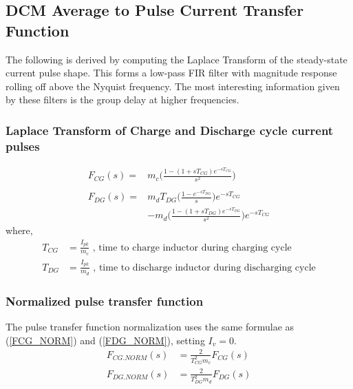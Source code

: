 \documentclass{scrartcl}
\begin{document}
\subsection{DCM Average to Pulse Current Transfer Function}	
The following is derived by computing the Laplace Transform of the steady-state current pulse shape.  This forms a low-pass FIR filter with magnitude response rolling off above the Nyquist frequency.  The most interesting information given by these filters is the group delay at higher frequencies.

\subsubsection{Laplace Transform of Charge and Discharge cycle current pulses}	

\begin{align}
F_{CG}(s) =&   m_c\bigg( \frac{1 - (1 + sT_{CG})e^{-sT_{CG}}}{s^2} \bigg)
\label{icg_IR_laplace_dcm} \\
\nonumber\\
F_{DG}(s) =&  m_d T_{DG} \bigg( \frac{1 - e^{-sT_{DG}}}{s} \bigg)  e^{-sT_{CG}}\nonumber\\
&- m_d \bigg( \frac{1 - (1 + sT_{DG})e^{-sT_{DG}}}{s^2} \bigg)  e^{-sT_{CG}}
\label{idg_IR_laplace_dcm}
\end{align}
where,
\begin{align}
	T_{CG} &= \frac{I_{pk}} {m_c} \text{ , time to charge inductor during charging cycle}\\
	T_{DG} &= \frac{I_{pk}} {m_d} \text{ , time to discharge inductor during discharging cycle}
\end{align}
	
		\subsubsection{Normalized pulse transfer function}
		The pulse transfer function normalization uses the same formulae as (\ref{FCG_NORM}) and (\ref{FDG_NORM}), setting $I_v=0$.
		\begin{align}
		F_{CG.NORM}(s) &= \frac{2}{T_{CG}^2m_c } F_{CG}(s)\label{FCG_NORM_DCM} \\
		F_{DG.NORM}(s) &= \frac{2}{T_{DG}^2m_d }F_{DG}(s) \label{FCG_NORM_DCM}
		\end{align}
	
\end{document}

